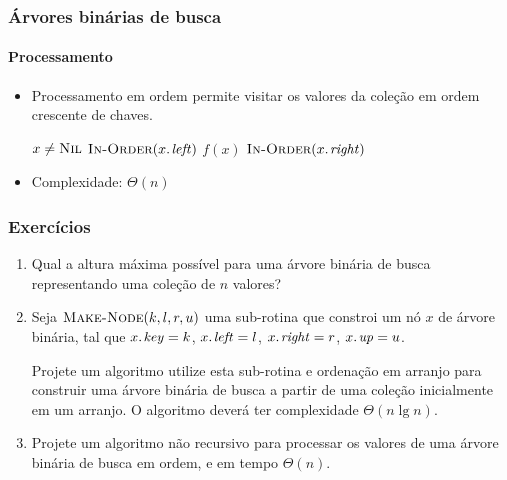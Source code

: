 \documentclass{beamer}
\begin{document}
\begin{frame}

\frametitle{Árvores binárias de busca}
\framesubtitle{Processamento}

\begin{itemize}
\item Processamento \alert{em ordem} permite visitar os valores da
  coleção em ordem crescente de chaves.

\begin{codebox}
  \li \If $x \neq \textnormal{\scshape Nil}$
  \li \Then $\proc{In-Order}(\attrib{x}{left})$
  \li $f(x)$
  \li $\proc{In-Order}(\attrib{x}{right})$
      \End
\end{codebox}

\item Complexidade: $\Theta(n)$
\end{itemize}

\end{frame}

\begin{frame}

\frametitle{Exercícios}

\begin{enumerate}

  \item Qual a altura máxima possível para uma árvore binária de busca
    representando uma coleção de $n$ valores?

  \item Seja $\textnormal{\scshape Make-Node}(k, l, r, u)$ uma sub-rotina que
    constroi um nó $x$ de árvore binária, tal que $\attrib{x}{key} =
    k$, $\attrib{x}{left} = l$, $\attrib{x}{right} = r$,
    $\attrib{x}{up} = u$.

    Projete um algoritmo utilize esta sub-rotina e ordenação em
    arranjo para construir uma árvore binária de busca a partir
    de uma coleção inicialmente em um arranjo. O algoritmo deverá
    ter complexidade $\Theta(n \lg n)$.

  \item Projete um algoritmo não recursivo para processar os valores
    de uma árvore binária de busca em ordem, e em tempo $\Theta(n)$.
\end{enumerate}
\end{frame}
\end{document}
